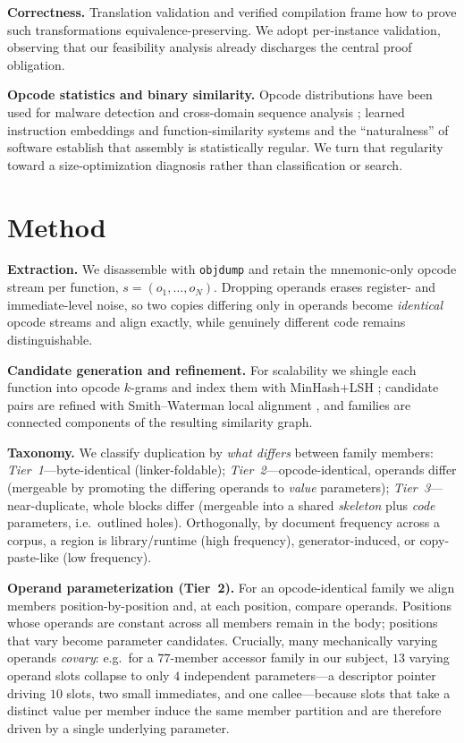 \documentclass[conference]{IEEEtran}
\begin{document}
\textbf{Correctness.} Translation validation \cite{lee2018alive2} and verified
compilation \cite{leroy2009compcert} frame how to prove such transformations
equivalence-preserving. We adopt per-instance validation, observing that our
feasibility analysis already discharges the central proof obligation.

\textbf{Opcode statistics and binary similarity.} Opcode distributions have
been used for malware detection and cross-domain sequence analysis
\cite{bilar2007opcodes,gan2009statistical}; learned instruction embeddings and
function-similarity systems \cite{li2021palmtree,marcelli2022machine} and the
``naturalness'' of software \cite{hindle2012naturalness} establish that
assembly is statistically regular. We turn that regularity toward a
size-optimization diagnosis rather than classification or search.

\section{Method}
\label{sec:method}
\textbf{Extraction.} We disassemble with \texttt{objdump} and retain the
mnemonic-only opcode stream per function, $s=(o_1,\dots,o_N)$. Dropping
operands erases register- and immediate-level noise, so two copies differing
only in operands become \emph{identical} opcode streams and align exactly,
while genuinely different code remains distinguishable.

\textbf{Candidate generation and refinement.} For scalability we shingle each
function into opcode $k$-grams and index them with MinHash$+$LSH
\cite{broder1997minhash}; candidate pairs are refined with Smith--Waterman
local alignment \cite{smithwaterman1981}, and families are connected
components of the resulting similarity graph.

\textbf{Taxonomy.} We classify duplication by \emph{what differs} between
family members:
\emph{Tier~1}---byte-identical (linker-foldable);
\emph{Tier~2}---opcode-identical, operands differ (mergeable by promoting the
differing operands to \emph{value} parameters);
\emph{Tier~3}---near-duplicate, whole blocks differ (mergeable into a shared
\emph{skeleton} plus \emph{code} parameters, i.e.\ outlined holes).
Orthogonally, by document frequency across a corpus, a region is
library/runtime (high frequency), generator-induced, or copy-paste-like (low
frequency).

\textbf{Operand parameterization (Tier~2).} For an opcode-identical family we
align members position-by-position and, at each position, compare operands.
Positions whose operands are constant across all members remain in the body;
positions that vary become parameter candidates. Crucially, many mechanically
varying operands \emph{covary}: e.g.\ for a $77$-member accessor family in our
subject, $13$ varying operand slots collapse to only $4$ independent
parameters---a descriptor pointer driving $10$ slots, two small immediates,
and one callee---because slots that take a distinct value per member induce the
same member partition and are therefore driven by a single underlying
parameter.
\end{document}
